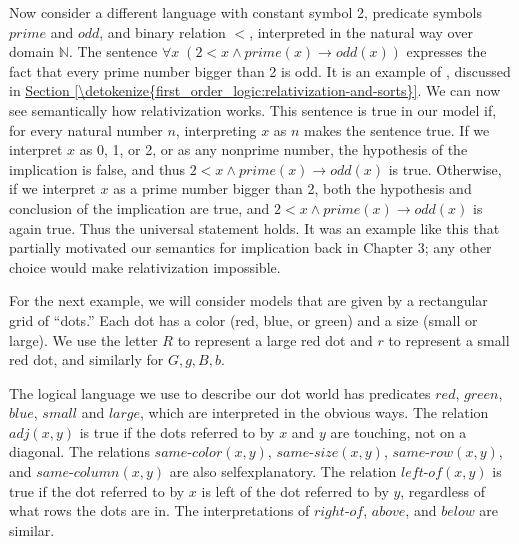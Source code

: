\documentclass[letterpaper,10pt,english]{sphinxmanual}
\begin{document}
\sphinxAtStartPar
Now consider a different language with constant symbol 2, predicate symbols \(\mathit{prime}\) and \(\mathit{odd}\), and binary relation \(<\), interpreted in the natural way over domain \({\mathbb N}\). The sentence \(\forall x \; (2 < x \wedge \mathit{prime}(x) \to \mathit{odd}(x))\) expresses the fact that every prime number bigger than 2 is odd. It is an example of , discussed in \hyperref[\detokenize{first_order_logic:relativization-and-sorts}]{Section \ref{\detokenize{first_order_logic:relativization-and-sorts}}}. We can now see semantically how relativization works. This sentence is true in our model if, for every natural number \(n\), interpreting \(x\) as \(n\) makes the sentence true. If we interpret \(x\) as 0, 1, or 2, or as any non\sphinxhyphen{}prime number, the hypothesis of the implication is false, and thus \(2 < x \wedge \mathit{prime}(x) \to \mathit{odd}(x)\) is true. Otherwise, if we interpret \(x\) as a prime number bigger than 2, both the hypothesis and conclusion of the implication are true, and \(2 < x \wedge \mathit{prime}(x) \to \mathit{odd}(x)\) is again true. Thus the universal statement holds. It was an example like this that partially motivated our semantics for implication back in Chapter 3; any other choice would make relativization impossible.

\sphinxAtStartPar
For the next example, we will consider models that are given by a rectangular grid of “dots.” Each dot has a color (red, blue, or green) and a size (small or large). We use the letter \(R\) to represent a large red dot and \(r\) to represent a small red dot, and similarly for \(G, g, B, b\).

\sphinxAtStartPar
The logical language we use to describe our dot world has predicates \(\mathit{red}\), \(\mathit{green}\), \(\mathit{blue}\), \(\mathit{small}\) and \(\mathit{large}\), which are interpreted in the obvious ways. The relation \(\mathit{adj}(x, y)\) is true if the dots referred to by \(x\) and \(y\) are touching, not on a diagonal. The relations \(\mathit{same{\mathord{\mbox{-}}}color}(x, y)\), \(\mathit{same{\mathord{\mbox{-}}}size}(x, y)\), \(\mathit{same{\mathord{\mbox{-}}}row}(x, y)\), and \(\mathit{same{\mathord{\mbox{-}}}column}(x, y)\) are also self\sphinxhyphen{}explanatory. The relation \(\mathit{left{\mathord{\mbox{-}}}of}(x, y)\) is true if the dot referred to by \(x\) is left of the dot referred to by \(y\), regardless of what rows the dots are in. The interpretations of \(\mathit{right{\mathord{\mbox{-}}}of}\), \(\mathit{above}\), and \(\mathit{below}\) are similar.
\end{document}
